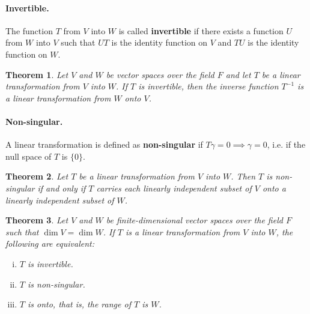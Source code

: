 \documentclass{article}
\newtheorem{theorem}{Theorem}[section]
\begin{document}
\paragraph{Invertible.} The function $T$ from $V$ into $W$ is called
\textbf{invertible} if there exists a function $U$ from $W$ into $V$ such that
$UT$ is the identity function on $V$ and $TU$ is the identity function on $W$.

\begin{theorem}
  Let $V$ and $W$ be vector spaces over the field $F$ and let $T$ be a linear
  transformation from $V$ into $W$. If $T$ is invertible, then the inverse
  function $T^{-1}$ is a linear transformation from $W$ onto $V$.
\end{theorem}

\paragraph{Non-singular.} A linear transformation is defined as
\textbf{non-singular} if $T\gamma = 0 \implies \gamma = 0$, i.e. if the null
space of $T$ is $\{0\}$.

\begin{theorem}
  Let $T$ be a linear transformation from $V$ into $W$. Then $T$ is non-singular
  if and only if $T$ carries each linearly independent subset of $V$ onto a
  linearly independent subset of $W$.
\end{theorem}

\begin{theorem}
  Let $V$ and $W$ be finite-dimensional vector spaces over the field $F$ such
  that $\dim V = \dim W$. If $T$ is a linear transformation from $V$ into $W$,
  the following are equivalent:
  \begin{enumerate}[(i)]
    \item $T$ is invertible.
    \item $T$ is non-singular.
    \item $T$ is onto, that is, the range of $T$ is $W$.
  \end{enumerate}
\end{theorem}
\end{document}
